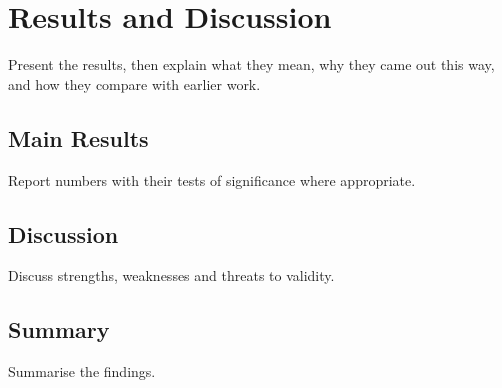 \chapter{Results and Discussion}
\label{ch:results}

Present the results, then explain what they mean, why they came out this way, and how they
compare with earlier work.

\section{Main Results}
Report numbers with their tests of significance where appropriate.

\section{Discussion}
Discuss strengths, weaknesses and threats to validity.

\section{Summary}
Summarise the findings.
